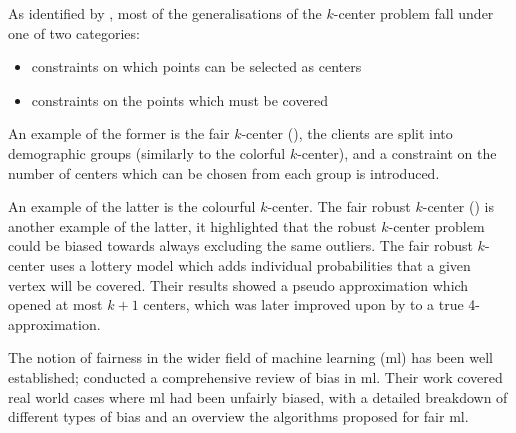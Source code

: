 As identified by \textcite{anegg_technique_2020}, most of the generalisations of the $k$-center problem fall under one of two categories:
\begin{itemize}
    \item constraints on which points can be selected as centers
    \item constraints on the points which must be covered
\end{itemize}

An example of the former is the fair $k$-center (\cite{kleindessner_fair_2019}), the clients are split into demographic groups (similarly to the colorful $k$-center), and a constraint on the number of centers which can be chosen from each group is introduced.

 An example of the latter is the colourful $k$-center. The fair robust $k$-center (\cite{harris_lottery_2017}) is another example of the latter, it highlighted that the robust $k$-center problem could be biased towards always excluding the same outliers. The fair robust $k$-center uses a lottery model which adds individual probabilities that a given vertex will be covered. Their results showed a pseudo approximation which opened at most $k+1$ centers, which was later improved upon by \citeauthor{anegg_technique_2020} to a true 4-approximation.

The notion of fairness in the wider field of machine learning (\acrshort{ml}) has been well established; \textcite{mehrabi_survey_2019} conducted a comprehensive review of bias in \acrshort{ml}. Their work covered real world cases where \acrshort{ml} had been unfairly biased, with a detailed breakdown of different types of bias and an overview the algorithms proposed for fair \acrshort{ml}.